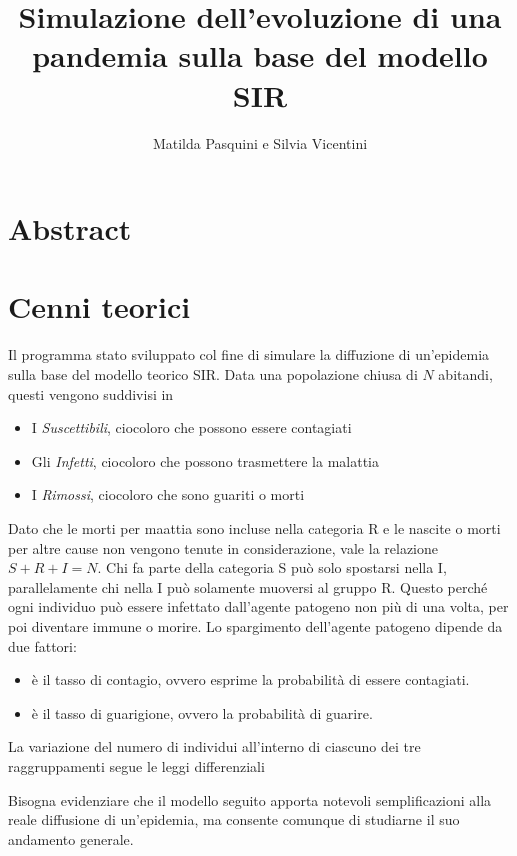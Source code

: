 \documentclass[12pt, a4paper]{article} %
\title{Simulazione dell'evoluzione di una pandemia sulla base del modello SIR}
\author{Matilda Pasquini e Silvia Vicentini}
\begin{document}
\maketitle
\section{Abstract}

\section{Cenni teorici}
Il programma \è stato sviluppato col fine di simulare la diffuzione di un'epidemia sulla base del modello teorico SIR. Data una popolazione chiusa di $N$ abitandi, questi vengono suddivisi in
\begin{itemize}
\item I \textit{Suscettibili}, cio\è coloro che possono essere contagiati
\item Gli \textit{Infetti}, cio\è coloro che possono trasmettere la malattia
\item I \textit{Rimossi}, cio\è coloro che sono guariti o morti
\end{itemize}
Dato che le morti per maattia sono incluse nella categoria R e le nascite o morti per altre cause non vengono tenute in considerazione, vale la relazione $S+R+I=N$. Chi fa parte della categoria S pu\`{o} solo spostarsi nella I, parallelamente chi nella I pu\`{o} solamente muoversi al gruppo R. Questo perch\'e ogni individuo pu\`{o} essere infettato dall'agente patogeno non pi\`{u} di una volta, per poi diventare immune o morire. 
Lo spargimento dell'agente patogeno dipende da due fattori:
\begin{itemize}
\item \textit{\beta} \`{e} il tasso di contagio, ovvero esprime la probabilit\`{a} di essere contagiati.
\item \textit{\gamma} \`{e} il tasso di guarigione, ovvero la probabilit\`{a} di guarire.
\end{itemize}
La variazione del numero di individui all'interno di ciascuno dei tre raggruppamenti segue le leggi differenziali
\begin{equation}

\end{equation}

Bisogna evidenziare che il modello seguito apporta notevoli semplificazioni alla reale diffusione di un'epidemia, ma consente comunque di studiarne il suo andamento generale.
\end{document}
